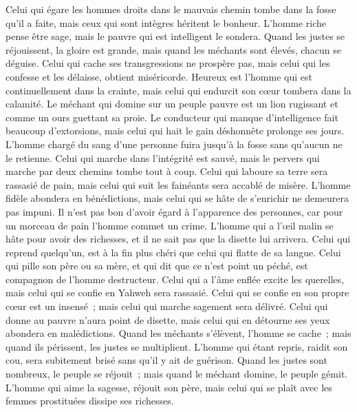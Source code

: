 \begin{multicols}{2}
Celui qui égare les hommes droits dans le mauvais chemin tombe dans la fosse qu'il a faite, mais ceux qui sont intègres héritent le bonheur.
L'homme riche pense être sage, mais le pauvre qui est intelligent le sondera.
Quand les justes se réjouissent, la gloire est grande, mais quand les méchants sont élevés, chacun se déguise.
Celui qui cache ses transgressions ne prospère pas, mais celui qui les confesse et les délaisse, obtient miséricorde.
Heureux est l'homme qui est continuellement dans la crainte, mais celui qui endurcit son cœur tombera dans la calamité.
Le méchant qui domine sur un peuple pauvre est un lion rugissant et comme un ours guettant sa proie.
Le conducteur qui manque d'intelligence fait beaucoup d'extorsions, mais celui qui hait le gain déshonnête prolonge ses jours.
L'homme chargé du sang d'une personne fuira jusqu'à la fosse sans qu'aucun ne le retienne.
Celui qui marche dans l'intégrité est sauvé, mais le pervers qui marche par deux chemins tombe tout à coup.
Celui qui laboure sa terre sera rassasié de pain, mais celui qui suit les fainéants sera accablé de misère.
L'homme fidèle abondera en bénédictions, mais celui qui se hâte de s'enrichir ne demeurera pas impuni.
Il n'est pas bon d'avoir égard à l'apparence des personnes, car pour un morceau de pain l'homme commet un crime.
L'homme qui a l'œil malin se hâte pour avoir des richesses, et il ne sait pas que la disette lui arrivera.
Celui qui reprend quelqu'un, est à la fin plus chéri que celui qui flatte de sa langue.
Celui qui pille son père ou sa mère, et qui dit que ce n'est point un péché, est compagnon de l'homme destructeur.
Celui qui a l'âme enflée excite les querelles, mais celui qui se confie en Yahweh sera rassasié.
Celui qui se confie en son propre cœur est un insensé~; mais celui qui marche sagement sera délivré.
Celui qui donne au pauvre n'aura point de disette, mais celui qui en détourne ses yeux abondera en malédictions.
Quand les méchants s'élèvent, l'homme se cache~; mais quand ils périssent, les justes se multiplient.
\VerseOne{}L'homme qui étant repris, raidit son cou, sera subitement brisé sans qu'il y ait de guérison.
Quand les justes sont nombreux, le peuple se réjouit~; mais quand le méchant domine, le peuple gémit.
L'homme qui aime la sagesse, réjouit son père, mais celui qui se plaît avec les femmes prostituées dissipe ses richesses.

\end{multicols}
